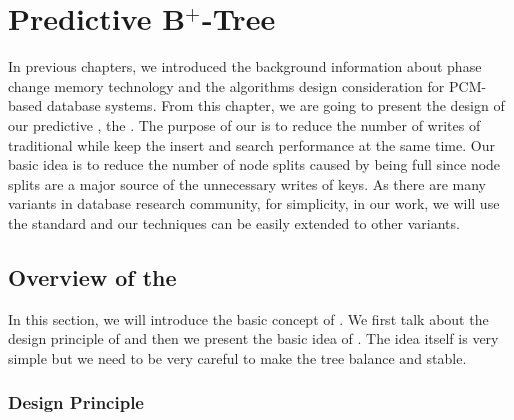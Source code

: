 \chapter{Predictive B$^+$-Tree}
\label{sec:pbtree}

In previous chapters, we introduced the background information about phase change memory technology
and the algorithms design consideration for PCM-based database systems. From this chapter, 
we are going to present the design of our predictive
\bplustree, the \bptree. The purpose of our \bptree is to reduce the number of writes of 
traditional \bplustree while keep the insert and search performance at the same time. 
Our basic idea is to reduce the number of node splits caused by being full since 
node splits are a major source of the unnecessary writes of keys. 
As there are many \bplustree variants in database research community,
for simplicity, in our work,
we will use the standard \bplustree and
our techniques can be easily extended to other variants.

\section{Overview of the {\large \bptree}} \label{subsec:overview}

In this section, we will introduce the basic concept of \bptree. We first talk about the design 
principle of \bptree and then we present the basic idea of \bptree. 
The idea itself is very simple but we need to be very careful to make the tree balance and stable. 

\subsection{Design Principle} 

